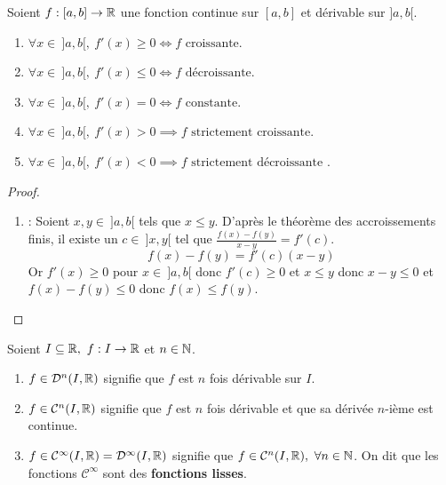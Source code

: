 \begin{proposition}
    Soient $f : [a, b] \to \mathbb{R}$ une fonction continue sur $[a, b]$ et dérivable sur $]a, b[$.
    \begin{enumerate}
            \item $\forall x \in \ ]a, b[,\ f'(x) \geq 0 \iff f \text{ croissante}$.
            \item $\forall x \in \ ]a, b[,\ f'(x) \leq 0 \iff f \text{ décroissante}$.
            \item $\forall x \in \ ]a, b[,\ f'(x) = 0 \iff f \text{ constante}$.
            \item $\forall x \in \ ]a, b[,\ f'(x) > 0 \implies f \text{ strictement croissante}$.
            \item $\forall x \in \ ]a, b[,\ f'(x) < 0 \implies f \text{ strictement décroissante}$ .
        \end{enumerate}
\end{proposition}

\begin{proof}
	\leavevmode
	\begin{enumerate}
		\item \boxed{\implies} :
		Soient $x, y \in \ ]a, b[$ tels que $x \leq y$. D'après le théorème des accroissements finis, il existe un $c \in \ ]x, y[$ tel que $\frac{f(x) - f(y)}{x - y} = f'(c)$.
		\[ f(x) - f(y) = f'(c)(x - y) \]
		Or $f'(x) \geq 0$ pour $x \in \ ]a, b[$ donc $f'(c) \geq 0$ et $x \leq y$ donc $x - y \leq 0$ et $f(x) - f(y) \leq 0$ donc  $f(x) \leq f(y)$.
	\end{enumerate}
\end{proof}

\begin{definition}
	Soient $I \subseteq \mathbb{R},\ f : I \to \mathbb{R}$ et $n \in \mathbb{N}$.
	\begin{enumerate}
		\item $f \in \mathcal{D}^n(I, \mathbb{R})$ signifie que $f$ est $n$ fois dérivable sur $I$.
		\item $f \in \mathcal{C}^n(I, \mathbb{R})$ signifie que $f$ est $n$ fois dérivable et que sa dérivée $n$-ième est continue.
		\item $f \in \mathcal{C}^{\infty}(I, \mathbb{R}) = \mathcal{D}^{\infty}(I, \mathbb{R})$ signifie que $f \in \mathcal{C}^n(I, \mathbb{R}),\ \forall n \in \mathbb{N}$. On dit que les fonctions $\mathcal{C}^{\infty}$ sont des \textbf{fonctions lisses}.
	\end{enumerate}
\end{definition}


